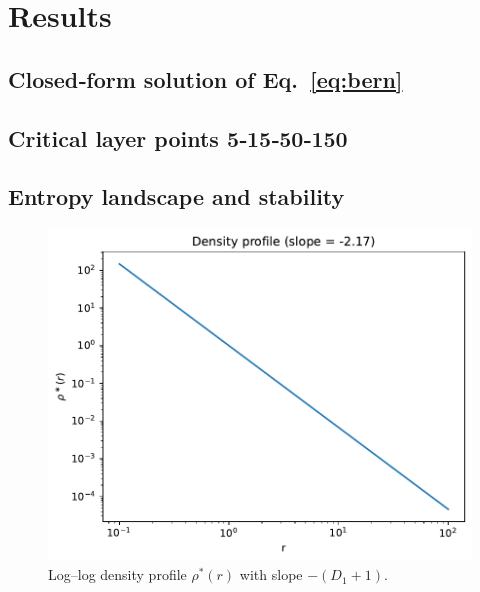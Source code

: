 \section{Results}\label{sec:results}

\subsection{Closed‑form solution of Eq.~\ref{eq:bern}}

\subsection{Critical layer points 5‑15‑50‑150}

\subsection{Entropy landscape and stability}

\begin{figure}[ht]
  \centering
  \includegraphics[width=0.7\linewidth]{figs/Fig1_density.pdf}
  \caption{Log–log density profile $\rho^\ast(r)$ with slope $-(D_1+1)$.}
  \label{fig:density}
\end{figure}
